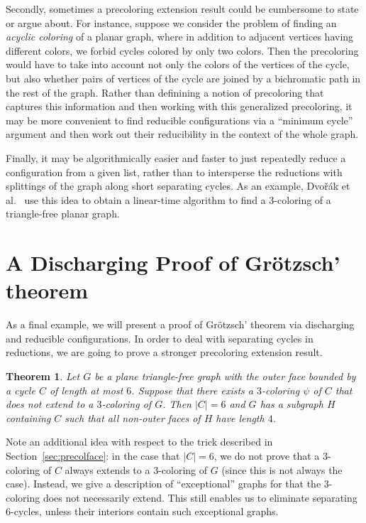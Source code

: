 \documentclass[12pt,twoside,openright,a4paper]{book}
\newtheorem{theorem}{Theorem}[chapter]
\begin{document}
Secondly, sometimes a precoloring extension result could be cumbersome to state or argue about.  For instance, suppose we consider
the problem of finding an \emph{acyclic coloring} of a planar graph, where in addition to adjacent vertices having different colors,
we forbid cycles colored by only two colors.  Then the precoloring would have to take into account not only the colors of the vertices
of the cycle, but also whether pairs of vertices of the cycle are joined by a bichromatic path in the rest of the graph.
Rather than definining a notion of precoloring that captures this information and then working with this generalized precoloring,
it may be more convenient to find reducible configurations via a ``minimum cycle'' argument and then work out their reducibility
in the context of the whole graph.

Finally, it may be algorithmically easier and faster to just repeatedly reduce a configuration from a given list, rather
than to intersperse the reductions with splittings of the graph along short separating cycles.
As an example, Dvo\v{r}\'ak et al.~\cite{DvoKawTho} use this idea to obtain a linear-time algorithm to find
a $3$-coloring of a triangle-free planar graph.

\section{A Discharging Proof of Gr\"{o}tzsch' theorem}\label{sec:disch-grotzsch}

As a final example, we will present a proof of Gr\"{o}tzsch' theorem via discharging and reducible configurations.
In order to deal with separating cycles in reductions, we are going to prove a stronger precoloring extension
result.

\begin{theorem}\label{thm:grotzsch-gimbel}
Let $G$ be a plane triangle-free graph with the outer face bounded by a cycle $C$ of length at most $6$.
Suppose that there exists a $3$-coloring $\psi$ of $C$ that does not extend to a $3$-coloring of $G$.
Then $|C|=6$ and $G$ has a subgraph $H$ containing $C$ such that all non-outer faces of $H$ have length $4$.
\end{theorem}

Note an additional idea with respect to the trick described in Section~\ref{sec:precolface}: in the case that $|C|=6$,
we do not prove that a $3$-coloring of $C$ always extends to a $3$-coloring of $G$ (since this is not always the case).
Instead, we give a description of ``exceptional'' graphs for that the $3$-coloring does not necessarily extend.
This still enables us to eliminate separating $6$-cycles, unless their interiors contain such exceptional graphs.
\end{document}
